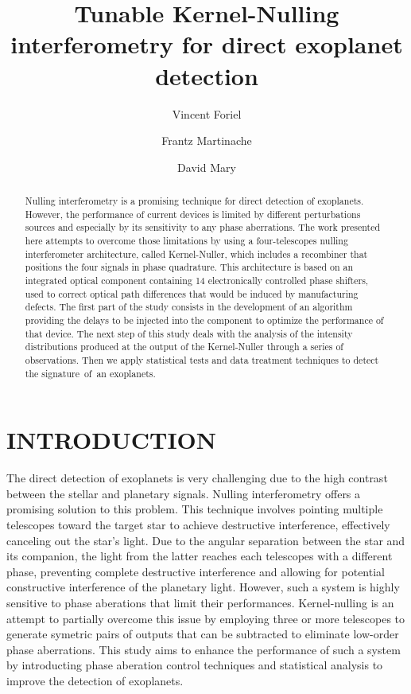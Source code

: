 \documentclass[]{spie}  %
\title{Tunable Kernel-Nulling interferometry for direct exoplanet detection}
\author[a,*]{Vincent Foriel}
\author[a]{Frantz Martinache}
\author[a]{David Mary}
\affil[a]{Université Côte d’Azur, Observatoire de la Côte d’Azur Nice, CNRS, Laboratoire Lagrange, Nice, France}
\begin{document}
\maketitle

\begin{abstract}

    Nulling interferometry\cite{Bracewell} is a promising technique for direct detection of exoplanets. However, the performance of current devices is limited by different perturbations sources \cite{Lay et al. 2004} and especially by its sensitivity to any phase aberrations. The work presented here attempts to overcome those limitations by using a four-telescopes nulling interferometer architecture, called Kernel-Nuller\cite{Martinache et al. 2018}, which includes a recombiner that positions the four signals in phase quadrature. This architecture is based on an integrated optical component containing 14 electronically controlled phase shifters, used to correct optical path differences that would be induced by manufacturing defects. The first part of the study consists in the development of an algorithm providing the delays to be injected into the component to optimize the performance of that device. The next step of this study deals with the analysis of the intensity distributions produced at the output of the Kernel-Nuller\cite{Martinache et al. 2018, Cvetojevic et al. 2022} through a series of observations. Then we apply statistical tests and data treatment techniques to detect the signature of an exoplanets.

\end{abstract}


\section{INTRODUCTION}
\label{sec:intro} %

The direct detection of exoplanets is very challenging due to the high contrast between the stellar and planetary signals. Nulling interferometry offers a promising solution to this problem. This technique involves pointing multiple telescopes toward the target star to achieve destructive interference, effectively canceling out the star's light. Due to the angular separation between the star and its companion, the light from the latter reaches each telescopes with a different phase, preventing complete destructive interference and allowing for potential constructive interference of the planetary light. However, such a system is highly sensitive to phase aberations that limit their performances. Kernel-nulling is an attempt to partially overcome this issue by employing three or more\cite{N telescope kernel} telescopes to generate symetric pairs of outputs that can be subtracted to eliminate low-order phase aberrations\cite{Martinache et al. 2018}. This study aims to enhance the performance of such a system by introducting phase aberation control techniques and statistical analysis to improve the detection of exoplanets.
\end{document}
